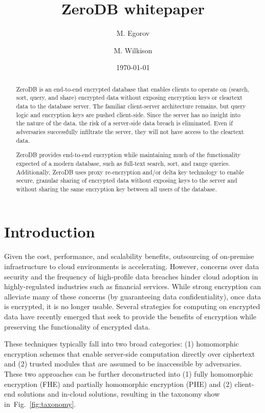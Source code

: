 \documentclass[notitlepage]{revtex4-1}
\newcommand{\figref}[1]{Fig.~\ref{#1}}
\begin{document}
\title{ZeroDB whitepaper}

\author{M. Egorov}
\author{M. Wilkison}

\begin{abstract}
ZeroDB is an end-to-end encrypted database that enables clients to operate on (search, sort, query, and share) encrypted data without exposing encryption keys or cleartext data to the database server.
The familiar client-server architecture remains, but query logic and encryption keys are pushed client-side.
Since the server has no insight into the nature of the data, the risk of a server-side data breach is eliminated.
Even if adversaries successfully infiltrate the server, they will not have access to the cleartext data.

ZeroDB provides end-to-end encryption while maintaining much of the functionality expected of a modern database, such as full-text search, sort, and range queries.
Additionally, ZeroDB uses proxy re-encryption and/or delta key technology to enable secure, granular sharing of encrypted data without exposing keys to the server and without sharing the same encryption key between all users of the database.
\end{abstract}

\date{\today}
\maketitle

\section{Introduction}

Given the cost, performance, and scalability benefits, outsourcing of on-premise infrastructure to cloud environments is accelerating.
However, concerns over data security and the frequency of high-profile data breaches hinder cloud adoption in highly-regulated industries such as financial services.
While strong encryption can alleviate many of these concerns (by guaranteeing data confidentiality), once data is encrypted, it is no longer usable.
Several strategies for computing on encrypted data have recently emerged that seek to provide the benefits of encryption while preserving the functionality of encrypted data.

These techniques typically fall into two broad categories: (1) homomorphic encryption schemes that enable server-side computation directly over ciphertext and (2) trusted modules that are assumed to be inaccessible by adversaries\cite{tutorial}. These two approaches can be further deconstructed into (1) fully homomorphic encryption (FHE) and partially homomorphic encryption (PHE) and (2) client-end solutions and in-cloud solutions, resulting in the taxonomy show in~\figref{fig:taxonomy}.
\end{document}
